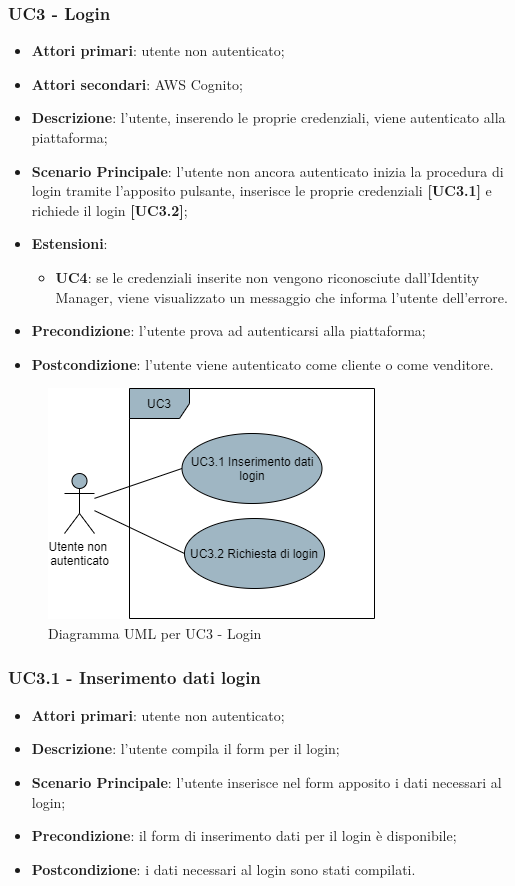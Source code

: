 \subsubsection{UC3 - Login}
\begin{itemize}
\item \textbf{Attori primari}: utente non autenticato;
\item \textbf{Attori secondari}: AWS Cognito;
\item \textbf{Descrizione}: l'utente, inserendo le proprie credenziali, viene autenticato alla piattaforma;
\item \textbf{Scenario Principale}: l'utente non ancora autenticato inizia la procedura di login tramite l'apposito pulsante, inserisce le proprie credenziali \textbf{[UC3.1]} e richiede il login \textbf{[UC3.2]};
\item \textbf{Estensioni}:
\begin{itemize}
	\item \textbf{UC4}: se le credenziali inserite non vengono riconosciute dall'Identity Manager, viene visualizzato un messaggio che informa l'utente dell'errore.
\end{itemize}
\item \textbf{Precondizione}: l'utente prova ad autenticarsi alla piattaforma;
\item \textbf{Postcondizione}: l'utente viene autenticato come cliente o come venditore.
\end{itemize}

\begin{figure}[H]
\centering
\includegraphics[scale=0.6]{res/UseCase/Immagini/LoginSottocasi}
\caption{Diagramma UML per UC3 - Login}
\end{figure}

\subsubsection{UC3.1 - Inserimento dati login}
\begin{itemize}
\item \textbf{Attori primari}: utente non autenticato;
\item \textbf{Descrizione}: l'utente compila il form per il login;
\item \textbf{Scenario Principale}: l'utente inserisce nel form apposito i dati necessari al login;
\item \textbf{Precondizione}: il form di inserimento dati per il login è disponibile;
\item \textbf{Postcondizione}: i dati necessari al login sono stati compilati.
\end{itemize}

